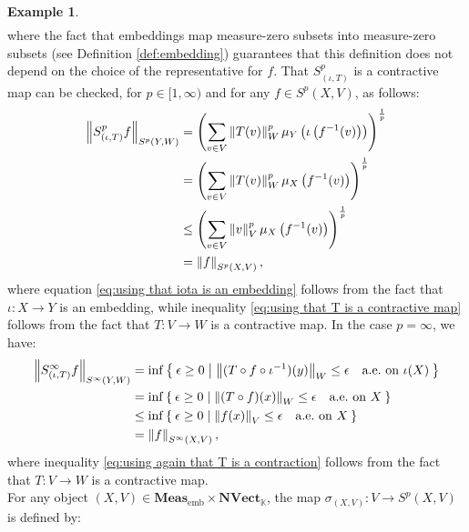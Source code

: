 \documentclass{amsart}
\theoremstyle{definition}
\newtheorem{example}[definition]{Example}
\theoremstyle{plain}
\newcommand{\norm}[1]{\left\lVert #1\right\rVert} %
\newcommand{\embMeas}{\mathbf{Meas}_\mathrm{emb}}
\newcommand{\NVect}{\mathbf{NVect}_{\mathbb{K}}}
\begin{document}
\begin{example}
\begin{equation}
\begin{split}
                \end{split}
            \end{equation}
            where the fact that embeddings map measure-zero subsets into measure-zero subsets (see Definition \ref{def:embedding}) guarantees that this definition does not depend on the choice of the representative for $f$.
            That $S^p_{(\iota,T)}$ is a contractive map can be checked, for $p \in [1,\infty)$ and for any $f \in S^p(X,V)$, as follows:
            \begin{align}
                \norm{S^p_{(\iota,T)} f}_{S^p(Y,W)} &= \left( \sum_{v \in V} \norm{T(v)}_W^p \mu_Y\left( \iota\left( f^{-1}(v) \right) \right) \right)^{\frac{1}{p}} \notag \\
                &= \left( \sum_{v \in V} \norm{T(v)}_W^p \mu_X\left( f^{-1}(v) \right) \right)^{\frac{1}{p}} \label{eq:using that iota is an embedding} \\
                & \leq \left( \sum_{v \in V} \norm{v}_V^p \mu_X\left( f^{-1}(v) \right) \right)^{\frac{1}{p}} \label{eq:using that T is a contractive map} \\
                &= \norm{f}_{S^p(X,V)}, \notag
            \end{align}
            where equation \eqref{eq:using that iota is an embedding} follows from the fact that $\iota \colon X \rightarrow Y$ is an embedding, while inequality \eqref{eq:using that T is a contractive map} follows from the fact that $T \colon V \rightarrow W$ is a contractive map.
            In the case $p = \infty$, we have:
            \begin{align}
                \norm{S^\infty_{(\iota,T)} f}_{S^\infty(Y,W)} &= \inf \Set{\epsilon \geq 0 | \norm{(T \circ f \circ \iota^{-1})(y)}_W \leq \epsilon \quad \text{a.e.~on} ~ \iota(X)} \notag \\
                &= \inf \Set{\epsilon \geq 0 | \norm{(T \circ f)(x)}_W \leq \epsilon \quad \text{a.e.~on} ~ X} \notag \\
                &\leq \inf \Set{\epsilon \geq 0 | \norm{f(x)}_V \leq \epsilon \quad \text{a.e.~on} ~ X} \label{eq:using again that T is a contraction} \\
                &= \norm{f}_{S^\infty(X,V)}, \notag
            \end{align}
            where inequality \eqref{eq:using again that T is a contraction} follows from the fact that $T \colon V \rightarrow W$ is a contractive map. \\
            For any object $(X,V) \in \embMeas \times \NVect$, the map $\sigma_{(X,V)} \colon V \rightarrow S^p(X,V)$ is defined by:

\end{example}
\end{document}
